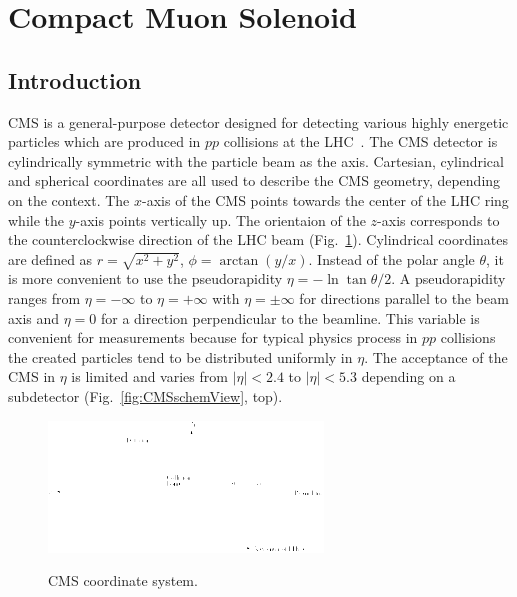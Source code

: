 \section{Compact Muon Solenoid}
\label{sec:Exp_CMS}
\subsection{Introduction}



CMS is a general-purpose detector designed for detecting various highly energetic particles which are produced in $pp$ collisions at the LHC~\cite{ref_CMS_TDR}. The CMS detector is cylindrically symmetric with the particle beam as the axis. Cartesian, cylindrical and spherical coordinates are all used to describe the CMS geometry, depending on the context. The $x$-axis of the CMS points towards the center of the LHC ring while the $y$-axis points vertically up. The orientaion of the $z$-axis corresponds to the counterclockwise direction of the LHC beam (Fig.~\ref{fig:CMScoord}). Cylindrical coordinates are defined as $r=\sqrt{x^2+y^2}$, $\phi=\arctan(y/x)$. Instead of the polar angle $\theta$, it is more convenient to use the pseudorapidity $\eta=-\ln{\tan{\theta/2}}$. A pseudorapidity ranges from $\eta=-\infty$ to $\eta=+\infty$ with $\eta=\pm \infty$ for directions parallel to the beam axis and $\eta=0$ for a direction perpendicular to the beamline. This variable is convenient for measurements because for typical physics process in $pp$ collisions the created particles tend to be distributed uniformly in $\eta$. The acceptance of the CMS in $\eta$ is limited and varies from $|\eta|<2.4$ to $|\eta|<5.3$ depending on a subdetector (Fig.~\ref{fig:CMSschemView}, top).   

\begin{figure}[htb]
  \begin{center}
    {\includegraphics[width=0.65\textwidth]{../figs/Exp/CMScoord.png}}
    \caption{CMS coordinate system. }
    \label{fig:CMScoord}
  \end{center}
\end{figure}

